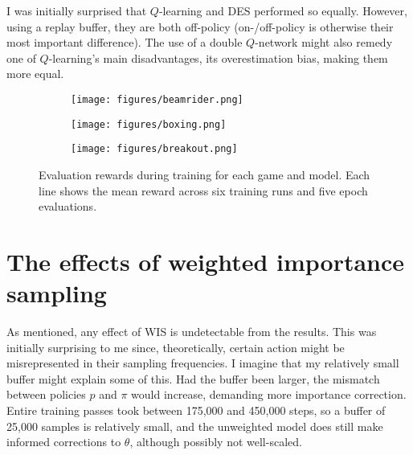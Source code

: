 \documentclass{article}
\begin{document}
I was initially surprised that \(Q\)-learning and DES performed so equally. However, using a replay buffer, they are both off-policy (on-/off-policy is otherwise their most important difference). The use of a double \(Q\)-network might also remedy one of \(Q\)-learning's main disadvantages, its overestimation bias, making them more equal.

\begin{figure}[h]
    \centering
    \begin{subfigure}[b]{0.7\textwidth}
        \texttt{[image: figures/beamrider.png]}
    \end{subfigure}
    
    \vspace{1em}  %
    
    \begin{subfigure}[b]{0.7\textwidth}
        \texttt{[image: figures/boxing.png]}
    \end{subfigure}
    
    \vspace{1em}  %
    
    \begin{subfigure}[b]{0.7\textwidth}
        \texttt{[image: figures/breakout.png]}
    \end{subfigure} 
    \caption{Evaluation rewards during training for each game and model. Each line shows the mean reward across six training runs and five epoch evaluations.}
    \label{fig:results}
\end{figure}

\section{The effects of weighted importance sampling}
As mentioned, any effect of WIS is undetectable from the results. This was initially surprising to me since, theoretically, certain action might be misrepresented in their sampling frequencies. I imagine that my relatively small buffer might explain some of this. Had the buffer been larger, the mismatch between policies \(p\) and \(\pi\) would increase, demanding more importance correction. Entire training passes took between 175,000 and 450,000 steps, so a buffer of 25,000 samples is relatively small, and the unweighted model does still make informed corrections to \(\theta\), although possibly not well-scaled.
\end{document}
